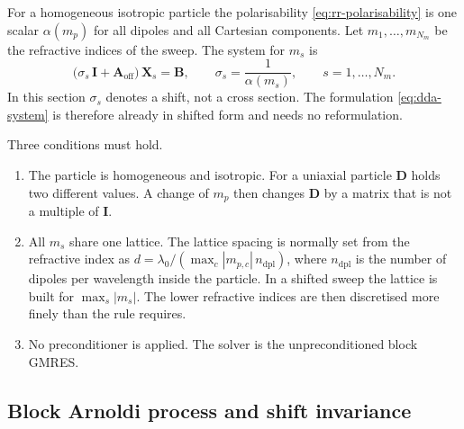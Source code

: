 \documentclass[11pt,a4paper]{article}
\begin{document}
For a homogeneous isotropic particle the polarisability
\eqref{eq:rr-polarisability} is one scalar $\alpha(m_p)$ for all
dipoles and all Cartesian components.
Let $m_1, \ldots, m_{N_m}$ be the refractive indices of the sweep.
The system for $m_s$ is
\begin{equation}
  \bigl(\sigma_s\,\mathbf{I} + \mathbf{A}_{\text{off}}\bigr)\,\mathbf{X}_s
    = \mathbf{B},
  \qquad
  \sigma_s = \frac{1}{\alpha(m_s)},
  \qquad
  s = 1, \ldots, N_m.
  \label{eq:shifted-systems}
\end{equation}
In this section $\sigma_s$ denotes a shift, not a cross section.
The formulation \eqref{eq:dda-system} is therefore already in shifted
form and needs no reformulation.

Three conditions must hold.
\begin{enumerate}
  \item The particle is homogeneous and isotropic.
        For a uniaxial particle $\mathbf{D}$ holds two different values.
        A change of $m_p$ then changes $\mathbf{D}$ by a matrix that is
        not a multiple of $\mathbf{I}$.
  \item All $m_s$ share one lattice.
        The lattice spacing is normally set from the refractive index as
        $d = \lambda_0 / (\max_c |m_{p,c}|\, n_{\text{dpl}})$, where
        $n_{\text{dpl}}$ is the number of dipoles per wavelength inside
        the particle.
        In a shifted sweep the lattice is built for $\max_s |m_s|$.
        The lower refractive indices are then discretised more finely
        than the rule requires.
  \item No preconditioner is applied.
        The solver is the unpreconditioned block GMRES.
\end{enumerate}

\subsection{Block Arnoldi process and shift invariance}
\label{sec:shift-arnoldi}
\end{document}
